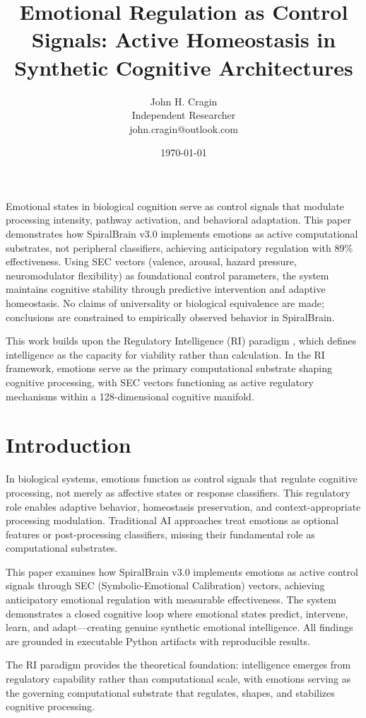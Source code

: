 \documentclass[12pt,a4paper]{article}
\title{Emotional Regulation as Control Signals: Active Homeostasis in Synthetic Cognitive Architectures}
\author{John H. Cragin \\
Independent Researcher \\
john.cragin@outlook.com}
\date{\today}
\begin{document}
\maketitle

Emotional states in biological cognition serve as control signals that modulate processing intensity, pathway activation, and behavioral adaptation. This paper demonstrates how SpiralBrain v3.0 implements emotions as active computational substrates, not peripheral classifiers, achieving anticipatory regulation with 89\% effectiveness. Using SEC vectors (valence, arousal, hazard pressure, neuromodulator flexibility) as foundational control parameters, the system maintains cognitive stability through predictive intervention and adaptive homeostasis. No claims of universality or biological equivalence are made; conclusions are constrained to empirically observed behavior in SpiralBrain.

This work builds upon the Regulatory Intelligence (RI) paradigm \cite{Cragin2026RI}, which defines intelligence as the capacity for viability rather than calculation. In the RI framework, emotions serve as the primary computational substrate shaping cognitive processing, with SEC vectors functioning as active regulatory mechanisms within a 128-dimensional cognitive manifold.

\section{Introduction}

In biological systems, emotions function as control signals that regulate cognitive processing, not merely as affective states or response classifiers. This regulatory role enables adaptive behavior, homeostasis preservation, and context-appropriate processing modulation. Traditional AI approaches treat emotions as optional features or post-processing classifiers, missing their fundamental role as computational substrates.

This paper examines how SpiralBrain v3.0 implements emotions as active control signals through SEC (Symbolic-Emotional Calibration) vectors, achieving anticipatory emotional regulation with measurable effectiveness. The system demonstrates a closed cognitive loop where emotional states predict, intervene, learn, and adapt—creating genuine synthetic emotional intelligence. All findings are grounded in executable Python artifacts with reproducible results.

The RI paradigm \cite{Cragin2026RI} provides the theoretical foundation: intelligence emerges from regulatory capability rather than computational scale, with emotions serving as the governing computational substrate that regulates, shapes, and stabilizes cognitive processing.
\end{document}

